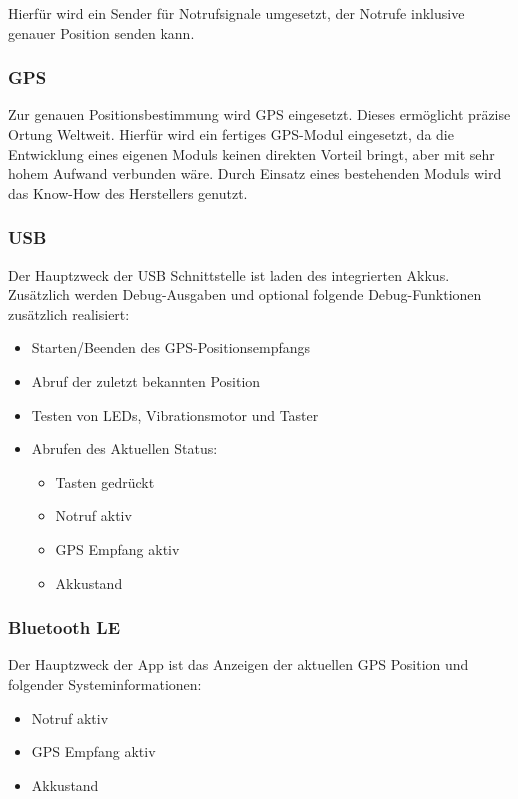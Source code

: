 Hierfür wird ein Sender für Notrufsignale umgesetzt, der Notrufe inklusive genauer Position senden kann.

\subsubsection{GPS}

Zur genauen Positionsbestimmung wird GPS eingesetzt. Dieses ermöglicht präzise Ortung Weltweit.
Hierfür wird ein fertiges GPS-Modul eingesetzt, da die Entwicklung eines eigenen Moduls keinen direkten Vorteil bringt, aber mit sehr hohem Aufwand verbunden wäre. Durch Einsatz eines bestehenden Moduls wird das Know-How des Herstellers genutzt.

\subsubsection{USB}

Der Hauptzweck der USB Schnittstelle ist laden des integrierten Akkus. Zusätzlich werden Debug-Ausgaben und optional folgende Debug-Funktionen zusätzlich realisiert:

\begin{itemize}
	\item Starten/Beenden des GPS-Positionsempfangs
	\item Abruf der zuletzt bekannten Position
	\item Testen von LEDs, Vibrationsmotor und Taster
	\item Abrufen des Aktuellen Status:
	\begin{itemize}
		\item Tasten gedrückt
		\item Notruf aktiv
		\item GPS Empfang aktiv
		\item Akkustand
	\end{itemize}
\end{itemize}

\subsubsection{Bluetooth LE}

Der Hauptzweck der App ist das Anzeigen der aktuellen GPS Position und folgender Systeminformationen:
\begin{itemize}
	\item Notruf aktiv
	\item GPS Empfang aktiv
	\item Akkustand
\end{itemize}

